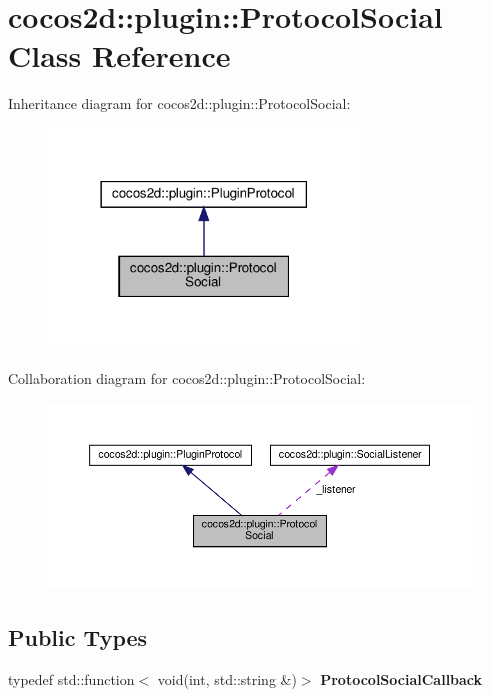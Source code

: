 \hypertarget{classcocos2d_1_1plugin_1_1ProtocolSocial}{}\section{cocos2d\+:\+:plugin\+:\+:Protocol\+Social Class Reference}
\label{classcocos2d_1_1plugin_1_1ProtocolSocial}


Inheritance diagram for cocos2d\+:\+:plugin\+:\+:Protocol\+Social\+:
\nopagebreak
\begin{figure}[H]
\begin{center}
\leavevmode
\includegraphics[width=234pt]{classcocos2d_1_1plugin_1_1ProtocolSocial__inherit__graph}
\end{center}
\end{figure}


Collaboration diagram for cocos2d\+:\+:plugin\+:\+:Protocol\+Social\+:
\nopagebreak
\begin{figure}[H]
\begin{center}
\leavevmode
\includegraphics[width=350pt]{classcocos2d_1_1plugin_1_1ProtocolSocial__coll__graph}
\end{center}
\end{figure}
\subsection*{Public Types}
\begin{DoxyCompactItemize}
\item 
\mbox{\label{classcocos2d_1_1plugin_1_1ProtocolSocial_adc51da439b5512fd45822f679847ec17}} 
typedef std\+::function$<$ void(int, std\+::string \&)$>$ {\bfseries Protocol\+Social\+Callback}
\end{DoxyCompactItemize}

